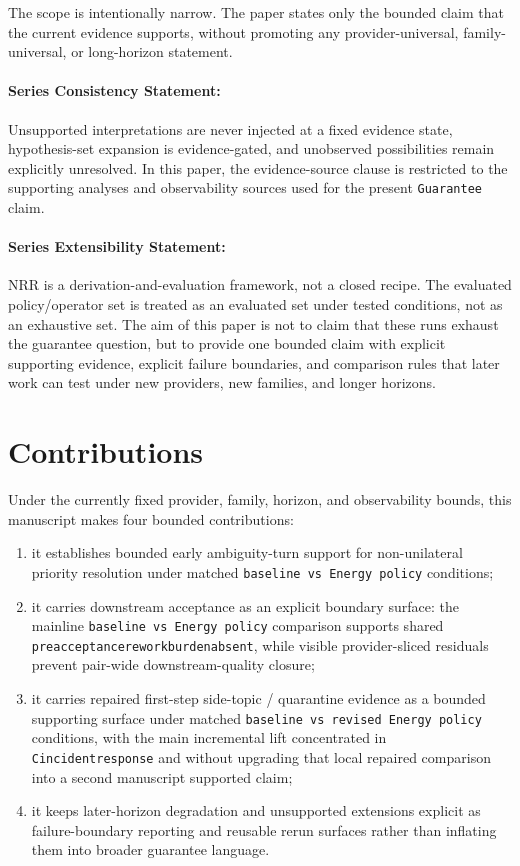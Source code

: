 \documentclass[11pt]{article}
\renewcommand{\_}{\textunderscore\hspace{0pt}}
\begin{document}
The scope is intentionally narrow. The paper states only the bounded claim that
the current evidence supports, without promoting any provider-universal,
family-universal, or long-horizon statement.

\paragraph{Series Consistency Statement:}
Unsupported interpretations are never injected at a fixed evidence state,
hypothesis-set expansion is evidence-gated, and unobserved possibilities remain
explicitly unresolved. In this paper, the evidence-source clause is restricted
to the supporting analyses and observability sources used for the present
\texttt{Guarantee} claim.

\paragraph{Series Extensibility Statement:}
NRR is a derivation-and-evaluation framework, not a closed recipe. The
evaluated policy/operator set is treated as an evaluated set under tested
conditions, not as an exhaustive set. The aim of this paper is not to claim
that these runs exhaust the guarantee question, but to provide one bounded
claim with explicit supporting evidence, explicit failure boundaries, and
comparison rules that later work can test under new providers, new families,
and longer horizons.

\section{Contributions}

Under the currently fixed provider, family, horizon, and observability bounds,
this manuscript makes four bounded contributions:

\begin{enumerate}
\item it establishes bounded early ambiguity-turn support for non-unilateral
priority resolution under matched \texttt{baseline vs Energy policy}
conditions;
\item it carries downstream acceptance as an explicit boundary surface: the
mainline \texttt{baseline vs Energy policy} comparison supports shared
\texttt{preacceptance\_rework\_burden\_absent}, while visible provider-sliced
residuals prevent pair-wide downstream-quality closure;
\item it carries repaired first-step side-topic / quarantine evidence as a
bounded supporting surface under matched
\texttt{baseline vs revised Energy policy} conditions, with the main
incremental lift concentrated in \texttt{C\_incident\_response} and without
upgrading that local repaired comparison into a second manuscript supported
claim;
\item it keeps later-horizon degradation and unsupported extensions explicit as
failure-boundary reporting and reusable rerun surfaces rather than inflating
them into broader guarantee language.
\end{enumerate}
\end{document}
